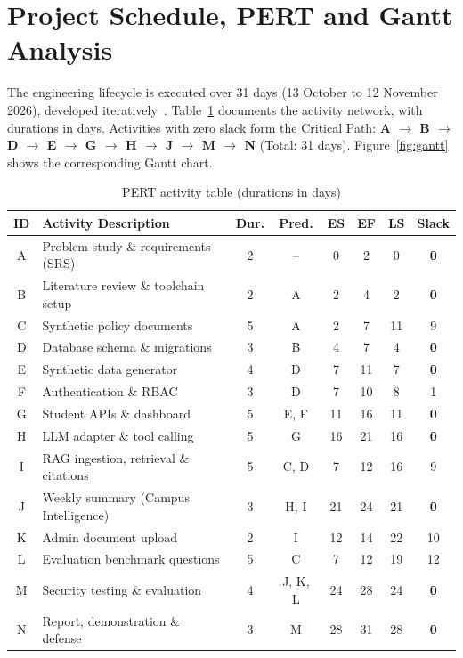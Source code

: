 \documentclass[11pt,a4paper,oneside]{report}
\begin{document}
\section{Project Schedule, PERT and Gantt Analysis}
The engineering lifecycle is executed over 31 days (13 October to 12 November 2026),
developed iteratively~\cite{larman2003iterative}. Table~\ref{tab:pert} documents the
activity network, with durations in days. Activities with zero slack form the Critical
Path: \textbf{A $\rightarrow$ B $\rightarrow$ D $\rightarrow$ E $\rightarrow$ G
$\rightarrow$ H $\rightarrow$ J $\rightarrow$ M $\rightarrow$ N} (Total: 31 days).
Figure~\ref{fig:gantt} shows the corresponding Gantt chart.

\begin{table}[H]
\centering
\caption{PERT activity table (durations in days)}
\label{tab:pert}
\small
\begin{tabular}{@{}clcccccc@{}}
\toprule
\textbf{ID} & \textbf{Activity Description} & \textbf{Dur.} & \textbf{Pred.} &
\textbf{ES} & \textbf{EF} & \textbf{LS} & \textbf{Slack}\\
\midrule
A & Problem study \& requirements (SRS)      & 2 & --      & 0  & 2  & 0  & \textbf{0}\\
B & Literature review \& toolchain setup      & 2 & A       & 2  & 4  & 2  & \textbf{0}\\
C & Synthetic policy documents               & 5 & A       & 2  & 7  & 11 & 9\\
D & Database schema \& migrations             & 3 & B       & 4  & 7  & 4  & \textbf{0}\\
E & Synthetic data generator                 & 4 & D       & 7  & 11 & 7  & \textbf{0}\\
F & Authentication \& RBAC                    & 3 & D       & 7  & 10 & 8  & 1\\
G & Student APIs \& dashboard                 & 5 & E, F    & 11 & 16 & 11 & \textbf{0}\\
H & LLM adapter \& tool calling               & 5 & G       & 16 & 21 & 16 & \textbf{0}\\
I & RAG ingestion, retrieval \& citations     & 5 & C, D    & 7  & 12 & 16 & 9\\
J & Weekly summary (Campus Intelligence)     & 3 & H, I    & 21 & 24 & 21 & \textbf{0}\\
K & Admin document upload                    & 2 & I       & 12 & 14 & 22 & 10\\
L & Evaluation benchmark questions           & 5 & C       & 7  & 12 & 19 & 12\\
M & Security testing \& evaluation            & 4 & J, K, L & 24 & 28 & 24 & \textbf{0}\\
N & Report, demonstration \& defense          & 3 & M       & 28 & 31 & 28 & \textbf{0}\\
\bottomrule
\end{tabular}
\end{table}
\end{document}
